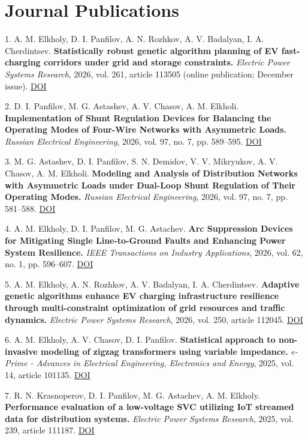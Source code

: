 \documentclass[10pt,a4paper]{article}
\begin{document}
\section*{Journal Publications}
1. A. M. Elkholy, D. I. Panfilov, A. N. Rozhkov, A. V. Badalyan, I. A. Cherdintsev. \textbf{Statistically robust genetic algorithm planning of EV fast-charging corridors under grid and storage constraints.} \textit{Electric Power Systems Research}, 2026, vol. 261, article 113505 (online publication; December issue). \href{https://doi.org/10.1016/j.epsr.2026.113505}{DOI}\par
2. D. I. Panfilov, M. G. Astashev, A. V. Chasov, A. M. Elkholi. \textbf{Implementation of Shunt Regulation Devices for Balancing the Operating Modes of Four-Wire Networks with Asymmetric Loads.} \textit{Russian Electrical Engineering}, 2026, vol. 97, no. 7, pp. 589–595. \href{https://doi.org/10.3103/s1068371226700847}{DOI}\par
3. M. G. Astashev, D. I. Panfilov, S. N. Demidov, V. V. Mikryukov, A. V. Chasov, A. M. Elkholi. \textbf{Modeling and Analysis of Distribution Networks with Asymmetric Loads under Dual-Loop Shunt Regulation of Their Operating Modes.} \textit{Russian Electrical Engineering}, 2026, vol. 97, no. 7, pp. 581–588. \href{https://doi.org/10.3103/s1068371226700835}{DOI}\par
4. A. M. Elkholy, D. I. Panfilov, M. G. Astachev. \textbf{Arc Suppression Devices for Mitigating Single Line-to-Ground Faults and Enhancing Power System Resilience.} \textit{IEEE Transactions on Industry Applications}, 2026, vol. 62, no. 1, pp. 596–607. \href{https://doi.org/10.1109/tia.2025.3585858}{DOI}\par
5. A. M. Elkholy, A. N. Rozhkov, A. V. Badalyan, I. A. Cherdintsev. \textbf{Adaptive genetic algorithms enhance EV charging infrastructure resilience through multi-constraint optimization of grid resources and traffic dynamics.} \textit{Electric Power Systems Research}, 2026, vol. 250, article 112045. \href{https://doi.org/10.1016/j.epsr.2025.112045}{DOI}\par
6. A. M. Elkholy, A. V. Chasov, D. I. Panfilov. \textbf{Statistical approach to non-invasive modeling of zigzag transformers using variable impedance.} \textit{e-Prime - Advances in Electrical Engineering, Electronics and Energy}, 2025, vol. 14, article 101135. \href{https://doi.org/10.1016/j.prime.2025.101135}{DOI}\par
7. R. N. Krasnoperov, D. I. Panfilov, M. G. Astachev, A. M. Elkholy. \textbf{Performance evaluation of a low-voltage SVC utilizing IoT streamed data for distribution systems.} \textit{Electric Power Systems Research}, 2025, vol. 239, article 111187. \href{https://doi.org/10.1016/j.epsr.2024.111187}{DOI}\par
\end{document}
